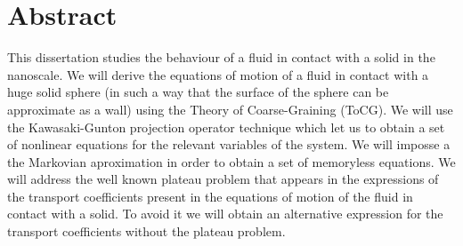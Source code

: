 \documentclass[b5paper,openright,10pt]{book}
\begin{document}
%
%
%
%
%
%

\pagestyle{Contents}  %
\tableofcontents %

\chapter*{Abstract} %
\pagestyle{noHeader}  %
This dissertation studies the behaviour of a fluid in contact with a solid in the nanoscale. We will derive the equations of motion of a fluid in contact with a huge solid sphere (in such a way that the surface of the sphere can be approximate as a wall) using the Theory of Coarse-Graining (ToCG).
We will use the Kawasaki-Gunton projection operator technique which let us to obtain a set of nonlinear equations for the relevant variables of the system. We will imposse a the Markovian aproximation in order to obtain a set of memoryless equations.
We will address the well known plateau problem  that appears in the expressions of the transport coefficients present in the equations of motion of the fluid in contact with a solid. To avoid it we will obtain an alternative expression for the transport coefficients without the plateau problem. 
\end{document}
